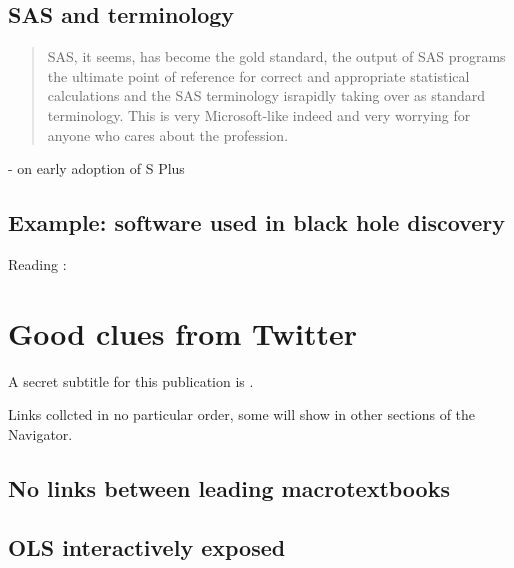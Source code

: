 \documentclass[letterpaper,10pt,english]{sphinxmanual}
\begin{document}
\section{SAS and terminology}
\label{\detokenize{software:sas-and-terminology}}\begin{quote}

SAS, it seems, has become the gold standard, the output of SAS
programs the ultimate point of reference for correct and appropriate
statistical calculations and the SAS terminology israpidly taking
over as standard terminology. This is very Microsoft-like indeed and
very worrying for anyone who cares about the profession.
\end{quote}

 - on early
adoption of S Plus


\section{Example: software used in black hole discovery}
\label{\detokenize{software:example-software-used-in-black-hole-discovery}}
Reading :




\chapter{Good clues from Twitter}
\label{\detokenize{tweets:good-clues-from-twitter}}\label{\detokenize{tweets::doc}}
A secret subtitle for this publication is .

Links collcted in no particular order, some will show in other sections of the Navigator.


\section{No links between leading macrotextbooks}
\label{\detokenize{tweets:no-links-between-leading-macrotextbooks}}



\section{OLS interactively exposed}
\label{\detokenize{tweets:ols-interactively-exposed}}
\end{document}
